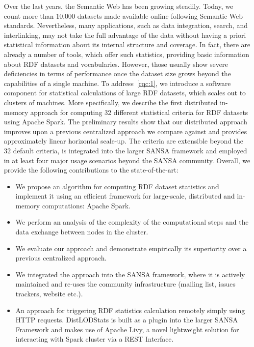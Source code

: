 Over the last years, the Semantic Web has been growing steadily. Today, we count more than 10,000 datasets made available online following Semantic Web standards.
Nevertheless, many applications, such as data integration, search, and interlinking, may not take the full advantage of the data without having a priori statistical information about its internal structure and coverage.
In fact, there are already a number of tools, which offer such statistics, providing basic information about RDF datasets and vocabularies.
However, those usually show severe deficiencies in terms of performance once the dataset size grows beyond the capabilities of a single machine.
To address~\ref{rqc:1}, we introduce a software component for statistical calculations of large RDF datasets, which scales out to clusters of machines.
More specifically, we describe the first distributed in-memory approach for computing 32 different statistical criteria for RDF datasets using Apache Spark.
The preliminary results show that our distributed approach improves upon a previous centralized approach we compare against and provides approximately linear horizontal scale-up. The criteria are extensible beyond the 32 default criteria, is integrated into the larger SANSA framework and employed in at least four major usage scenarios beyond the SANSA community.
Overall, we provide the following contributions to the state-of-the-art:
\begin{itemize}
    \item We propose an algorithm for computing RDF dataset statistics and implement it using an efficient framework for large-scale, distributed and in-memory computations: Apache Spark.
    \item We perform an analysis of the complexity of the computational steps and the data exchange between nodes in the cluster. 
    \item We evaluate our approach and demonstrate empirically its superiority over a previous centralized approach.
    \item We integrated the approach into the SANSA framework, where it is actively maintained and re-uses the community infrastructure (mailing list, issues trackers, website etc.).
    \item An approach for triggering RDF statistics calculation remotely simply using HTTP requests. 
    DistLODStats is built as a plugin into the larger SANSA Framework and makes use of Apache Livy, a novel lightweight solution for interacting with Spark cluster via a REST Interface.
\end{itemize}


